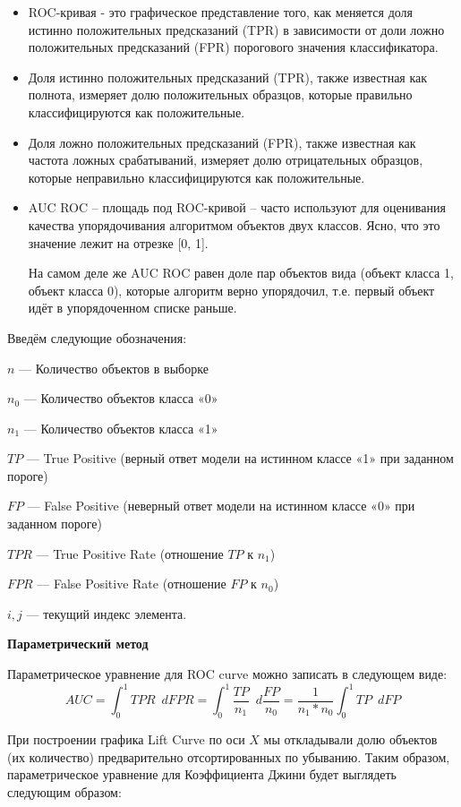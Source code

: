 \begin{itemize}
    \item ROC-кривая - это графическое представление того, как меняется доля истинно положительных предсказаний (TPR) в зависимости от доли ложно положительных предсказаний (FPR) порогового значения классификатора.

    \item Доля истинно положительных предсказаний (TPR), также известная как полнота, измеряет долю положительных образцов, которые правильно классифицируются как положительные.

    \item Доля ложно положительных предсказаний (FPR), также известная как частота ложных срабатываний, измеряет долю отрицательных образцов, которые неправильно классифицируются как положительные.

    \item AUC ROC – площадь под ROC-кривой – часто используют для оценивания качества упорядочивания алгоритмом объектов двух классов. Ясно, что это значение лежит на отрезке [0, 1].

          На самом деле же AUC ROC равен доле пар объектов вида (объект класса 1, объект класса 0), которые алгоритм верно упорядочил, т.е. первый объект идёт в упорядоченном списке раньше.
\end{itemize}

Введём следующие обозначения:

$n$ — Количество объектов в выборке

$n_0$ — Количество объектов класса «0»

$n_1$ — Количество объектов класса «1»

$TP$ — True Positive (верный ответ модели на истинном классе «1» при заданном пороге)

$FP$ — False Positive (неверный ответ модели на истинном классе «0» при заданном пороге)

$TPR$ — True Positive Rate (отношение $TP$ к $n_1$)

$FPR$ — False Positive Rate (отношение $FP$ к $n_0$)

$i, j$ — текущий индекс элемента.


{\bf Параметрический метод}

Параметрическое уравнение для ROC curve можно записать в следующем виде:
$$AUC = \int_{0}^{1} TPR \enspace dFPR = \int_{0}^{1} \frac{TP}{n_1} \enspace d\frac{FP}{n_0} = \frac{1}{n_1*n_0}\int_{0}^{1}TP \enspace dFP $$


При построении графика Lift Curve по оси $X$ мы откладывали долю объектов (их количество) предварительно отсортированных по убыванию. Таким образом, параметрическое уравнение для Коэффициента Джини будет выглядеть следующим образом:

